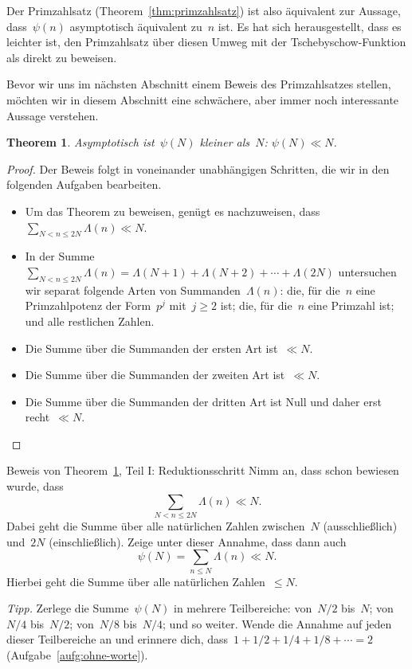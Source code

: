 \documentclass[twoside]{../zirkelblatt1415}
\theoremstyle{definition}
\theoremstyle{plain}
\newtheorem{thm}[defn]{Theorem}
\theoremstyle{remark}
\begin{document}
Der Primzahlsatz (Theorem~\ref{thm:primzahlsatz}) ist also äquivalent zur
Aussage, dass~$\psi(n)$ asymptotisch äquivalent zu~$n$ ist. Es hat sich
herausgestellt, dass es leichter ist, den Primzahlsatz über diesen Umweg mit
der Tschebyschow-Funktion als direkt zu beweisen.

Bevor wir uns im nächsten Abschnitt einem Beweis des Primzahlsatzes stellen,
möchten wir in diesem Abschnitt eine schwächere, aber immer noch interessante
Aussage verstehen.

\begin{thm}\label{thm:psi-obere-schranke}
Asymptotisch ist~$\psi(N)$ kleiner als~$N$: $\psi(N) \ll N$.
\end{thm}

\begin{proof}Der Beweis folgt in voneinander unabhängigen Schritten, die wir in
den folgenden Aufgaben bearbeiten.
\begin{itemize}
\item Um das Theorem zu beweisen, genügt es nachzuweisen, dass~$\sum_{N < n
\leq 2N} \Lambda(n) \ll N$.
\item In der Summe~$\sum_{N < n \leq 2N} \Lambda(n) = \Lambda(N+1) +
\Lambda(N+2) + \cdots + \Lambda(2N)$ untersuchen wir separat folgende Arten von
Summanden~$\Lambda(n)$: die, für die~$n$ eine Primzahlpotenz der Form~$p^j$
mit~$j \geq 2$ ist; die, für die~$n$ eine Primzahl ist; und alle restlichen
Zahlen.
\item Die Summe über die Summanden der ersten Art ist~$\ll N$.
\item Die Summe über die Summanden der zweiten Art ist~$\ll N$.
\item Die Summe über die Summanden der dritten Art ist Null und daher erst
recht~$\ll N$. \qedhere
\end{itemize}
\end{proof}

\begin{aufgabe}{Beweis von Theorem~\ref{thm:psi-obere-schranke}, Teil I:
Reduktionsschritt}
Nimm an, dass schon bewiesen wurde, dass
\[ \sum_{N < n \leq 2N} \Lambda(n) \ll N. \]
Dabei geht die Summe über alle natürlichen Zahlen zwischen~$N$ (ausschließlich)
und~$2N$ (einschließlich). Zeige unter dieser Annahme, dass dann auch
\[ \psi(N) = \sum_{n \leq N} \Lambda(n) \ll N. \]
Hierbei geht die Summe über alle natürlichen Zahlen~$\leq N$.

\emph{Tipp.} Zerlege die Summe~$\psi(N)$ in mehrere Teilbereiche:
von~$N/2$ bis~$N$; von~$N/4$ bis~$N/2$; von~$N/8$ bis~$N/4$; und so weiter.
Wende die Annahme auf jeden dieser Teilbereiche an und erinnere dich, dass~$1 +
1/2 + 1/4 + 1/8 + \cdots = 2$ (Aufgabe~\ref{aufg:ohne-worte}).
\end{aufgabe}
\end{document}
